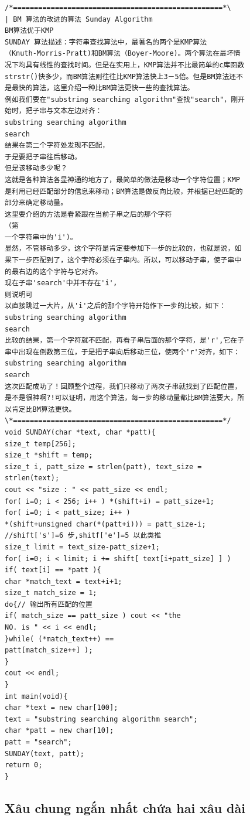 \documentclass[11pt]{article}
\begin{document}
\begingroup
\scriptsize
\begin{verbatim}
/*==================================================*\
| BM 算法的改进的算法 Sunday Algorithm
BM算法优于KMP
SUNDAY 算法描述：字符串查找算法中，最著名的两个是KMP算法
（Knuth-Morris-Pratt)和BM算法（Boyer-Moore)。两个算法在最坏情
况下均具有线性的查找时间。但是在实用上，KMP算法并不比最简单的c库函数
strstr()快多少，而BM算法则往往比KMP算法快上3－5倍。但是BM算法还不
是最快的算法，这里介绍一种比BM算法更快一些的查找算法。
例如我们要在"substring searching algorithm"查找"search"，刚开
始时，把子串与文本左边对齐：
substring searching algorithm
search
结果在第二个字符处发现不匹配，
于是要把子串往后移动。
但是该移动多少呢？
这就是各种算法各显神通的地方了，最简单的做法是移动一个字符位置；KMP
是利用已经匹配部分的信息来移动；BM算法是做反向比较，并根据已经匹配的
部分来确定移动量。
这里要介绍的方法是看紧跟在当前子串之后的那个字符
（第
一个字符串中的'i')。
显然，不管移动多少，这个字符是肯定要参加下一步的比较的，也就是说，如
果下一步匹配到了，这个字符必须在子串内。所以，可以移动子串，使子串中
的最右边的这个字符与它对齐。
现在子串'search'中并不存在'i'，
则说明可
以直接跳过一大片，从'i'之后的那个字符开始作下一步的比较，如下：
substring searching algorithm
search
比较的结果，第一个字符就不匹配，再看子串后面的那个字符，是'r',它在子
串中出现在倒数第三位，于是把子串向后移动三位，使两个'r'对齐，如下：
substring searching algorithm
search
这次匹配成功了！回顾整个过程，我们只移动了两次子串就找到了匹配位置，
是不是很神啊?!可以证明，用这个算法，每一步的移动量都比BM算法要大，所
以肯定比BM算法更快。
\*==================================================*/
void SUNDAY(char *text, char *patt){
size_t temp[256];
size_t *shift = temp;
size_t i, patt_size = strlen(patt), text_size =
strlen(text);
cout << "size : " << patt_size << endl;
for( i=0; i < 256; i++ ) *(shift+i) = patt_size+1;
for( i=0; i < patt_size; i++ )
*(shift+unsigned char(*(patt+i))) = patt_size-i;
//shift['s']=6 步,shitf['e']=5 以此类推
size_t limit = text_size-patt_size+1;
for( i=0; i < limit; i += shift[ text[i+patt_size] ] )
if( text[i] == *patt ){
char *match_text = text+i+1;
size_t match_size = 1;
do{// 输出所有匹配的位置
if( match_size == patt_size ) cout << "the
NO. is " << i << endl;
}while( (*match_text++) ==
patt[match_size++] );
}
cout << endl;
}
int main(void){
char *text = new char[100];
text = "substring searching algorithm search";
char *patt = new char[10];
patt = "search";
SUNDAY(text, patt);
return 0;
}
\end{verbatim}
\endgroup

\subsection{Xâu chung ngắn nhất chứa hai xâu dài}
\end{document}
